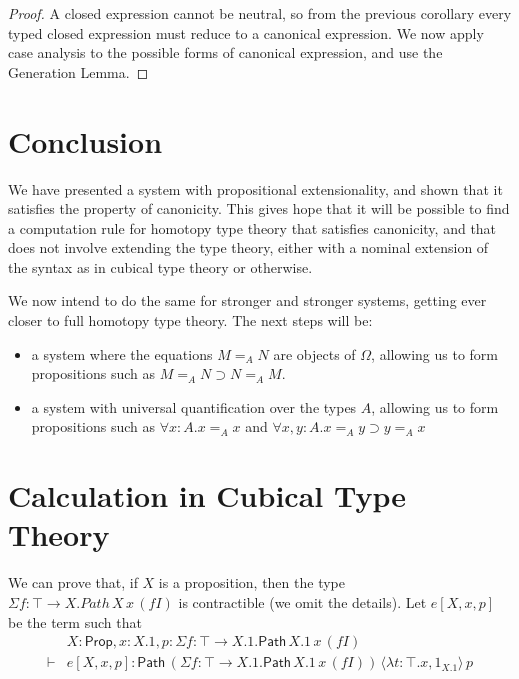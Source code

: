 \documentclass[a4paper,UKenglish]{lipics-v2016}
\newcommand{\Path}[3]{\ensuremath{\mathsf{Path} \, {#1} \, {#2} \, {#3}}}
\newcommand{\Prop}{\mathsf{Prop}}
\theoremstyle{plain}
\theoremstyle{definition}
\begin{document}
\begin{proof}
A closed expression cannot be neutral, so from the previous corollary every typed closed expression must reduce to a canonical expression.
We now apply case analysis to the possible forms of canonical expression, and use the Generation Lemma.
\end{proof}

\section{Conclusion}

We have presented a system with propositional extensionality, and shown that it satisfies the property of canonicity.
This gives hope that it will be possible to find a computation rule for homotopy type theory that satisfies canonicity, and
that does not involve extending the type theory, either with a nominal extension of the syntax as in cubical type theory or
otherwise.

We now intend to do the same for stronger and stronger systems, getting
ever closer to full homotopy type theory.  The next steps will be:

\begin{itemize}
\item
a system where the equations $M =_A N$ are objects of $\Omega$, allowing us to form propositions such as $M =_A N \supset N =_A M$.
\item
a system with universal quantification over the types $A$, allowing us to form propositions such as $\forall x:A. x =_A x$ and
$\forall x,y : A. x =_A y \supset y =_A x$
\end{itemize}



\appendix

\section{Calculation in Cubical Type Theory}
\label{appendix:cubical}

\newcommand{\steptwo}{\mathsf{step}_2}
\newcommand{\stepthree}{\mathsf{step}_3}

We can prove that, if $X$ is a proposition, then the type $\Sigma f:\top \rightarrow X. Path \, X \, x \, (f I)$ is contractible (we omit the details).  Let $e[X, x, p]$ be the term such that
\begin{align*} & X : \Prop, x : X.1, p : \Sigma f:\top \rightarrow X.1. \Path{X.1}{x}{(fI)} \\
\vdash & e[X, x, p] : \Path{(\Sigma f:\top \rightarrow X.1. \Path{X.1}{x}{(f I)})}{\langle \lambda t : \top . x, 1_{X.1} \rangle}{p}
\end{align*}
\end{document}
